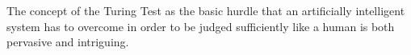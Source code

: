 \documentclass[12pt]{article}
\begin{document}
The concept of the Turing Test as the basic hurdle that an artificially intelligent system has to overcome in order to be judged sufficiently like a human is both pervasive and intriguing.
\end{document}
